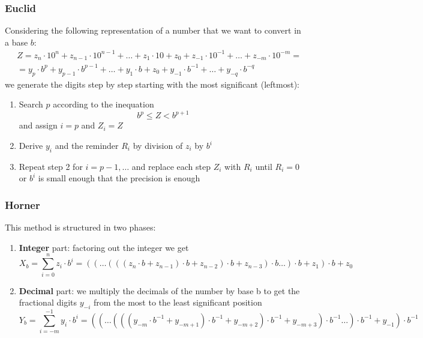 \subsubsection{Euclid}
Considering the following representation of a number that we want to convert in a base $b$:
\begin{align*}
	& Z = z_n\cdot 10^n + z_{n-1} \cdot 10^{n-1} + \ldots + z_1 \cdot 10 + z_0 + z_{-1} \cdot 10^{-1} + \ldots + z_{-m} \cdot 10^{-m} = \\
	& = y_p\cdot b ^p + y_{p-1} \cdot b^{p-1} + \ldots + y_1 \cdot b+ z_0 + y_{-1} \cdot b^{-1} + \ldots + y_{-q} \cdot b^{-q}
\end{align*}
we generate the digits step by step starting with the most significant (leftmost):
\begin{enumerate}
	\item Search $p$ according to the inequation
	\begin{equation*}
		b^p \leq Z < b^{p+1}
	\end{equation*}
	and assign $i=p$ and $Z_i = Z$
	\item Derive $y_i$ and the reminder $R_i$ by division of $z_i$ by $b^i$
	\item Repeat step 2 for $i=p-1, \ldots$ and replace each step $Z_i$ with $R_i$ until $R_i = 0$ or $b^i$ is small enough that the precision is enough
\end{enumerate}
\subsubsection{Horner}
This method is structured in two phases:
\begin{enumerate}
	\item \textbf{Integer} part: factoring out the integer we get
	\begin{equation*}
		X_b = \sum_{i=0}^{n} z_i \cdot b^i = ((\ldots (((z_n \cdot b + z_{n-1}) \cdot b + z_{n-2}) \cdot b + z_{n-3}) \cdot b \ldots) \cdot b + z_1) \cdot b + z_0
	\end{equation*}
	\item \textbf{Decimal} part: we multiply the decimals of the number by base b to get the fractional digits $y_{-i}$ from the most to the least significant position
	\begin{equation*}
		Y_b = \sum_{i=-m}^{-1} y_i \cdot b^i = ((\ldots (((y_{-m} \cdot b^{-1} + y_{-m+1}) \cdot b^{-1} + y_{-m+2}) \cdot b^{-1} + y_{-m+3}) \cdot b^{-1} \ldots) \cdot b^{-1} + y_{-1}) \cdot b^{-1}
	\end{equation*}
\end{enumerate}
